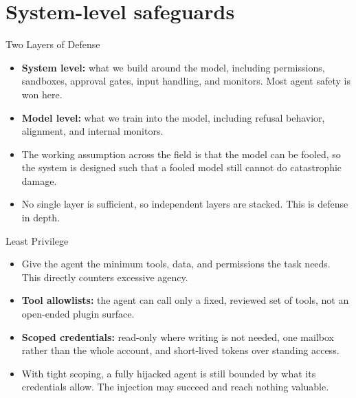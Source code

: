 \section{System-level safeguards}

\begin{frame}{Two Layers of Defense}
  \begin{itemize}\itemsep0.5em
    \item[\textcolor{KAred}{$\blacktriangleright$}] \textbf{System level:} what we build around the model, including permissions, sandboxes, approval gates, input handling, and monitors. Most agent safety is won here.
    \item[\textcolor{KAred}{$\blacktriangleright$}] \textbf{Model level:} what we train into the model, including refusal behavior, alignment, and internal monitors.
    \item[\textcolor{KAred}{$\blacktriangleright$}] The working assumption across the field is that the model can be fooled, so the system is designed such that a fooled model still cannot do catastrophic damage.
    \item[\textcolor{KAred}{$\blacktriangleright$}] No single layer is sufficient, so independent layers are stacked. This is defense in depth.
  \end{itemize}
\end{frame}

\begin{frame}{Least Privilege}
  \begin{itemize}\itemsep0.5em
    \item[\textcolor{KAred}{$\blacktriangleright$}] Give the agent the minimum tools, data, and permissions the task needs. This directly counters excessive agency.
    \item[\textcolor{KAred}{$\blacktriangleright$}] \textbf{Tool allowlists:} the agent can call only a fixed, reviewed set of tools, not an open-ended plugin surface.
    \item[\textcolor{KAred}{$\blacktriangleright$}] \textbf{Scoped credentials:} read-only where writing is not needed, one mailbox rather than the whole account, and short-lived tokens over standing access.
    \item[\textcolor{KAred}{$\blacktriangleright$}] With tight scoping, a fully hijacked agent is still bounded by what its credentials allow. The injection may succeed and reach nothing valuable.
  \end{itemize}
\end{frame}


